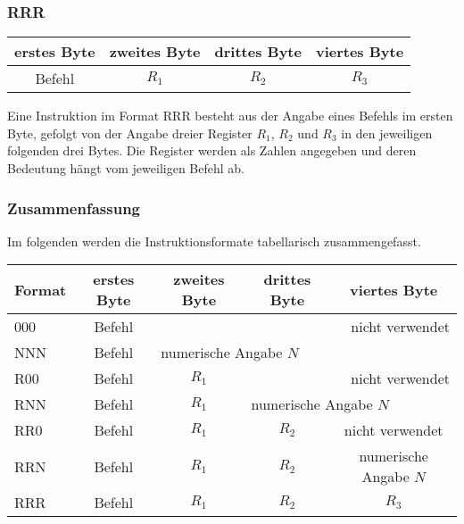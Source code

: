 \subsubsection{RRR}
\label{RRR}

\begin{center}
  \begin{tabular}{|*{4}{c|}} \hline
    erstes Byte & zweites Byte  & drittes Byte  & viertes Byte \\\hline\hline
    Befehl      & $R_{1}$       & $R_{2}$       & $R_{3}$      \\\hline
  \end{tabular}
\end{center}

Eine Instruktion im Format RRR besteht aus der Angabe eines Befehls im ersten
Byte, gefolgt von der Angabe dreier Register $R_{1}$, $R_{2}$ und $R_{3}$ in den
jeweiligen folgenden drei Bytes.
Die Register werden als Zahlen angegeben und deren Bedeutung hängt vom
jeweiligen Befehl ab.


\subsubsection{Zusammenfassung}
\label{subsec:Instr-Formate-Zusammenfassung}
Im folgenden werden die Instruktionsformate tabellarisch zusammengefasst.

\begin{center}
  \begin{tabular}{|l||*{4}{c|}}
    \hline
    Format & erstes Byte & zweites Byte  & drittes Byte  & viertes Byte
    \\\hline\hline
    000 & Befehl & \multicolumn{3}{r|}{nicht verwendet}                 \\\hline
    NNN & Befehl & \multicolumn{3}{l|}{numerische Angabe $N$}           \\\hline
    R00 & Befehl & $R_{1}$ & \multicolumn{2}{r|}{nicht verwendet}       \\\hline
    RNN & Befehl & $R_{1}$ & \multicolumn{2}{l|}{numerische Angabe $N$} \\\hline
    RR0 & Befehl & $R_{1}$ & $R_{2}$ &  nicht verwendet                 \\\hline
    RRN & Befehl & $R_{1}$ & $R_{2}$ & numerische Angabe $N$            \\\hline
    RRR & Befehl & $R_{1}$ & $R_{2}$ & $R_{3}$                          \\\hline
  \end{tabular}
\end{center}



